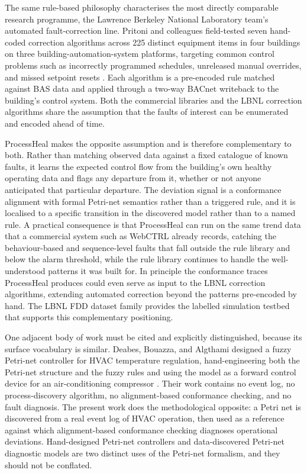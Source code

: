\documentclass[11pt,letterpaper]{article}
\begin{document}
The same rule-based philosophy characterises the most directly comparable research programme, the Lawrence Berkeley National Laboratory team's automated fault-correction line. Pritoni and colleagues field-tested seven hand-coded correction algorithms across 225 distinct equipment items in four buildings on three building-automation-system platforms, targeting common control problems such as incorrectly programmed schedules, unreleased manual overrides, and missed setpoint resets \cite{pritoni2022faultcorrection}. Each algorithm is a pre-encoded rule matched against BAS data and applied through a two-way BACnet writeback to the building's control system. Both the commercial libraries and the LBNL correction algorithms share the assumption that the faults of interest can be enumerated and encoded ahead of time.

ProcessHeal makes the opposite assumption and is therefore complementary to both. Rather than matching observed data against a fixed catalogue of known faults, it learns the expected control flow from the building's own healthy operating data and flags any departure from it, whether or not anyone anticipated that particular departure. The deviation signal is a conformance alignment with formal Petri-net semantics rather than a triggered rule, and it is localised to a specific transition in the discovered model rather than to a named rule. A practical consequence is that ProcessHeal can run on the same trend data that a commercial system such as WebCTRL already records, catching the behaviour-based and sequence-level faults that fall outside the rule library and below the alarm threshold, while the rule library continues to handle the well-understood patterns it was built for. In principle the conformance traces ProcessHeal produces could even serve as input to the LBNL correction algorithms, extending automated correction beyond the patterns pre-encoded by hand. The LBNL FDD dataset family \cite{granderson2020lbnlfdddata} provides the labelled simulation testbed that supports this complementary positioning.

One adjacent body of work must be cited and explicitly distinguished, because its surface vocabulary is similar. Deabes, Bouazza, and Algthami designed a fuzzy Petri-net controller for HVAC temperature regulation, hand-engineering both the Petri-net structure and the fuzzy rules and using the model as a forward control device for an air-conditioning compressor \cite{deabes2023fuzzyptn}. Their work contains no event log, no process-discovery algorithm, no alignment-based conformance checking, and no fault diagnosis. The present work does the methodological opposite: a Petri net is discovered from a real event log of HVAC operation, then used as a reference against which alignment-based conformance checking diagnoses operational deviations. Hand-designed Petri-net controllers and data-discovered Petri-net diagnostic models are two distinct uses of the Petri-net formalism, and they should not be conflated.



\end{document}
